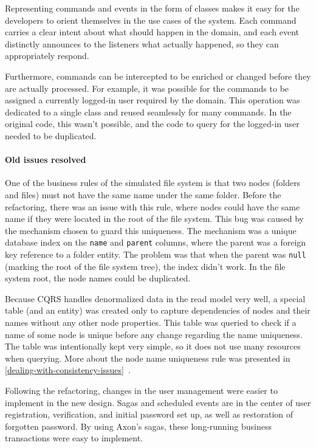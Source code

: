 \documentclass{book}
\begin{document}
Representing commands and events in the form of classes makes it easy
for the developers to orient themselves in the use cases of the system.
Each command carries a clear intent about what should happen in the
domain, and each event distinctly announces to the listeners what
actually happened, so they can appropriately respond.

Furthermore, commands can be intercepted to be enriched or changed
before they are actually processed. For example, it was possible for the
commands to be assigned a currently logged-in user required by the
domain. This operation was dedicated to a single class and reused
seamlessly for many commands. In the original code, this wasn't
possible, and the code to query for the logged-in user needed to be
duplicated.

\paragraph{Old issues resolved}\label{old-issues-resolved}

One of the business rules of the simulated file system is that two nodes
(folders and files) must not have the same name under the same folder.
Before the refactoring, there was an issue with this rule, where nodes
could have the same name if they were located in the root of the file
system. This bug was caused by the mechanism chosen to guard this
uniqueness. The mechanism was a unique database index on the
\texttt{name} and \texttt{parent} columns, where the parent was a
foreign key reference to a folder entity. The problem was that when the
parent was \texttt{null} (marking the root of the file system tree), the
index didn't work. In the file system root, the node names could be
duplicated.

Because CQRS handles denormalized data in the read model very well, a
special table (and an entity) was created only to capture dependencies
of nodes and their names without any other node properties. This table
was queried to check if a name of some node is unique before any change
regarding the name uniqueness. The table was intentionally kept very
simple, so it does not use many resources when querying. More about the
node name uniqueness rule was presented in
\ref{dealing-with-consistency-issues}~.

Following the refactoring, changes in the user management were easier to
implement in the new design. Sagas and scheduled events are in the
center of user registration, verification, and initial password set up,
as well as restoration of forgotten password. By using Axon's sagas,
these long-running business transactions were easy to implement.
\end{document}
